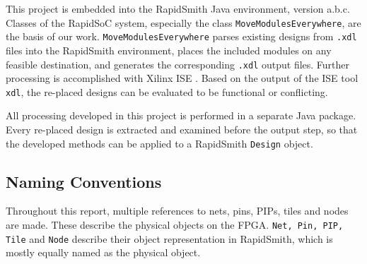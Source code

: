 This project is embedded into the RapidSmith Java environment, version a.b.c. Classes of the RapidSoC system, especially the class \texttt{MoveModulesEverywhere}, are the basis of our work. \texttt{MoveModulesEverywhere} parses existing designs from \texttt{.xdl} files into the RapidSmith environment, places the included modules on any feasible destination, and generates the corresponding \texttt{.xdl} output files. Further processing is accomplished with Xilinx ISE \cite{ise}. Based on the output of the ISE tool \texttt{xdl}, the re-placed designs can be evaluated to be functional or conflicting.

All processing developed in this project is performed in a separate Java package. Every re-placed design is extracted and examined before the output step, so that the developed methods can be applied to a RapidSmith \texttt{Design} object.

\subsection{Naming Conventions}
\label{subsec:namingconventions}

Throughout this report, multiple references to nets, pins, PIPs, tiles and nodes are made. These describe the physical objects on the FPGA. \texttt{Net, Pin, PIP, Tile} and \texttt{Node} describe their object representation in RapidSmith, which is mostly equally named as the physical object. 